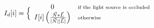 \documentclass{article}
\begin{document}
$$
I_d[i]=\Big\{
\begin{array}{clcr}
0 & \scriptsize \textrm{if the light source is occluded} \\
I[i] \left( \frac{\vec N * \vec L}{|\vec N||\vec L|}\right) & \scriptsize \textrm{otherwise}
\end{array}
$$
\end{document}
